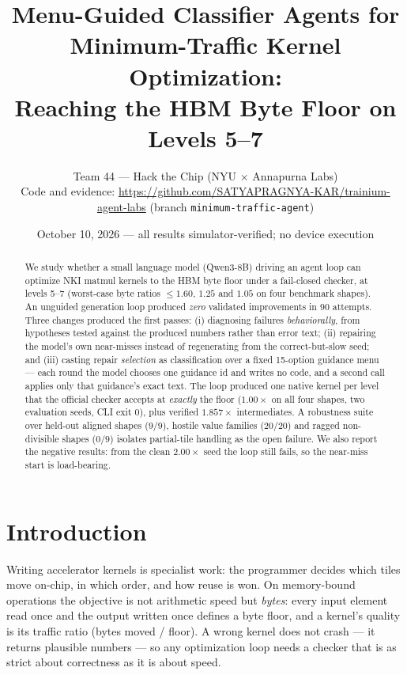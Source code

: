 \documentclass[10pt]{article}
\title{\vspace{-1.4em}\Large Menu-Guided Classifier Agents for Minimum-Traffic Kernel Optimization:\\[2pt] \large Reaching the HBM Byte Floor on Levels 5--7}
\author{\normalsize Team 44 --- Hack the Chip (NYU $\times$ Annapurna Labs)\\[2pt]
\small Code and evidence: \url{https://github.com/SATYAPRAGNYA-KAR/trainium-agent-labs} (branch \texttt{minimum-traffic-agent})}
\date{\small October 10, 2026 --- all results simulator-verified; no device execution}
\begin{document}
\maketitle
\vspace{-2.2em}

\begin{abstract}
\noindent We study whether a small language model (Qwen3-8B) driving an agent loop can optimize NKI
matmul kernels to the HBM byte floor under a fail-closed checker, at levels 5--7 (worst-case byte
ratios $\leq 1.60$, $1.25$ and $1.05$ on four benchmark shapes). An unguided generation loop
produced \emph{zero} validated improvements in 90 attempts. Three changes produced the first
passes: (i) diagnosing failures \emph{behaviorally}, from hypotheses tested against the produced
numbers rather than error text; (ii) repairing the model's own near-misses instead of regenerating
from the correct-but-slow seed; and (iii) casting repair \emph{selection} as classification over a
fixed 15-option guidance menu --- each round the model chooses one guidance id and writes no code,
and a second call applies only that guidance's exact text. The loop produced one native kernel per
level that the official checker accepts at \emph{exactly} the floor ($1.00\times$ on all four
shapes, two evaluation seeds, CLI exit 0), plus verified $1.857\times$ intermediates. A robustness
suite over held-out aligned shapes ($9/9$), hostile value families ($20/20$) and ragged
non-divisible shapes ($0/9$) isolates partial-tile handling as the open failure. We also report the
negative results: from the clean $2.00\times$ seed the loop still fails, so the near-miss start is
load-bearing.
\end{abstract}

\section{Introduction}
Writing accelerator kernels is specialist work: the programmer decides which tiles move on-chip,
in which order, and how reuse is won. On memory-bound operations the objective is not arithmetic
speed but \emph{bytes}: every input element read once and the output written once defines a byte
floor, and a kernel's quality is its traffic ratio (bytes moved / floor). A wrong kernel does not
crash --- it returns plausible numbers --- so any optimization loop needs a checker that is as
strict about correctness as it is about speed.
\end{document}
